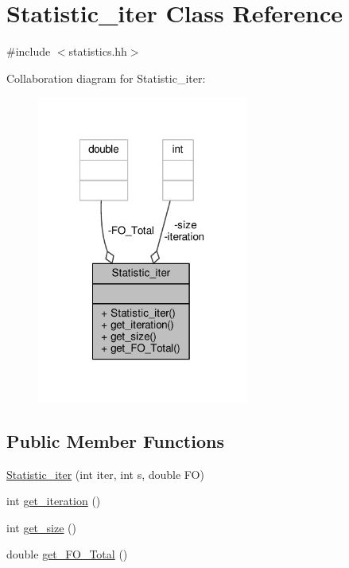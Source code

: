 \hypertarget{classStatistic__iter}{\section{Statistic\-\_\-iter Class Reference}
\label{classStatistic__iter}
}


{\ttfamily \#include $<$statistics.\-hh$>$}



Collaboration diagram for Statistic\-\_\-iter\-:\nopagebreak
\begin{figure}[H]
\begin{center}
\leavevmode
\includegraphics[width=197pt]{classStatistic__iter__coll__graph}
\end{center}
\end{figure}
\subsection*{Public Member Functions}
\begin{DoxyCompactItemize}
\item 
\hyperlink{classStatistic__iter_a73b50c3786507016143ab5d438405ac6}{Statistic\-\_\-iter} (int iter, int s, double F\-O)
\item 
int \hyperlink{classStatistic__iter_ace06be19a5b3813b315dae44b5b3f6e7}{get\-\_\-iteration} ()
\item 
int \hyperlink{classStatistic__iter_a5ccad38b82ce4a06e11321ae3fdd2fc6}{get\-\_\-size} ()
\item 
double \hyperlink{classStatistic__iter_a38fc7e962059a8e492a2e9d1e89c5f5d}{get\-\_\-\-F\-O\-\_\-\-Total} ()
\end{DoxyCompactItemize}
